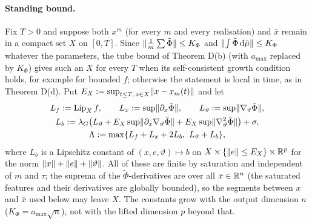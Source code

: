 \paragraph{Standing bound.} Fix $T>0$ and suppose both $x^m$ (for every $m$ and every realisation) and $\bar x$ remain
in a compact set $X$ on $[0,T]$. Since $\lVert \frac1m\sum\tilde\Phi\rVert \le K_\Phi$ and
$\lVert \int\tilde\Phi\,\mathrm{d}\bar\mu\rVert \le K_\Phi$ whatever the parameters, the tube bound of Theorem D(b) (with $a_{\max}$
replaced by $K_\Phi$) gives such an $X$ for every $T$ when its self-consistent growth condition holds, for example for
bounded $f$; otherwise the statement is local in time, as in Theorem D(d). Put
$E_X := \sup_{t\le T,\,x\in X}\lVert x - x_m(t)\rVert$ and let
\begin{gather*}
  L_f := \operatorname{Lip}_X f,\qquad L_x := \sup\lVert \partial_x\tilde\Phi\rVert,\qquad
  L_\vartheta := \sup\lVert \nabla_\vartheta\tilde\Phi\rVert,\\
  L_b := \lambda_G\bigl(L_\vartheta + E_X\sup\lVert \partial_x\nabla_\vartheta\tilde\Phi\rVert
  + E_X\sup\lVert \nabla^2_\vartheta\tilde\Phi\rVert\bigr) + \sigma,\\
  \Lambda := \max\{L_f + L_x + 2L_b,\ L_\vartheta + L_b\},
\end{gather*}
where $L_b$ is a Lipschitz constant of $(x,e,\vartheta)\mapsto b$ on $X\times\{\lVert e\rVert\le E_X\}\times\mathbb{R}^p$ for the
norm $\lVert x\rVert + \lVert e\rVert + \lVert \vartheta\rVert$. All of these are finite by saturation and independent of $m$ and
$\tau$; the suprema of the $\tilde\Phi$-derivatives are over all $x\in\mathbb{R}^n$ (the saturated features and their
derivatives are globally bounded), so the segments between $x$ and $\bar x$ used below may leave $X$. The constants
grow with the output dimension $n$ ($K_\Phi = a_{\max}\sqrt n$), not with the lifted dimension $p$ beyond that.

